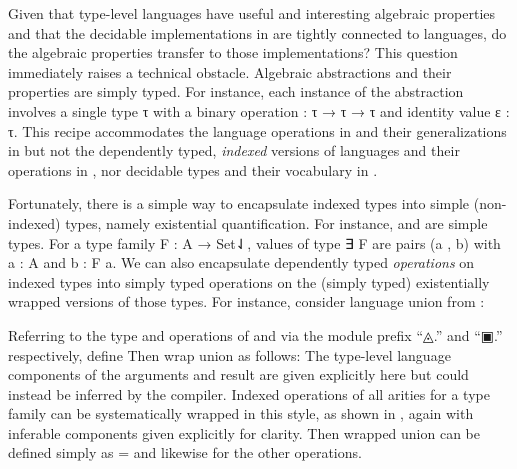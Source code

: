 \documentclass[acmsmall,screen]{acmart}
\begin{document}

\rnc{}

Given that type-level languages have useful and interesting algebraic properties and that the decidable implementations in  are tightly connected to languages, do the algebraic properties transfer to those implementations?
This question immediately raises a technical obstacle.
Algebraic abstractions and their properties are simply typed.
For instance, each instance of the  abstraction involves a single type \AB τ with a binary operation { \AK : \AB τ \AK → \AB τ \AK → \AB τ} and identity value {\AB ε \AK : \AB τ}.
This recipe accommodates the language operations in  and their generalizations in  but not the dependently typed, \emph{indexed} versions of languages and their operations in , nor decidable types and their vocabulary in .

Fortunately, there is a simple way to encapsulate indexed types into simple (non-indexed) types, namely existential quantification.
For instance, { } and { } are simple types.
For a type family {\AB F \AK : \AB A \AK → \APT Set⇃}, values of type {\AF ∃ \AB F} are pairs {(\AB a , \AB b)} with {\AB a \AK : \AB A} and {\AB b \AK : \AB F \AB a}.
We can also encapsulate dependently typed \emph{operations} on indexed types into simply typed operations on the (simply typed) existentially wrapped versions of those types.
For instance, consider language union from :
\begin{code}
\>[2]%
\>[7]\AgdaSymbol{:}\AgdaSpace{}%
%
\>[15]%
\>[18]\AgdaSpace{}%
\AgdaSpace{}%
%
\>[28]\AgdaSpace{}%
\AgdaSpace{}%
\AgdaSymbol{(}%
\>[39]%
\>[44]\AgdaSymbol{)}\<%
\end{code}
Referring to the type and operations of  and  via the module prefix ``{◬.}\hspace{0.05em}'' and ``{▣.}\hspace{0.05em}'' respectively, define 
Then wrap union as follows:
The type-level language components of the arguments and result are given explicitly here but could instead be inferred by the compiler.
\rnc{}
Indexed operations of all arities for a type family  can be systematically wrapped in this style, as shown in
, again with inferable components given explicitly for clarity.
Then wrapped union can be defined simply as { \AS =  } and likewise for the other operations.
\end{document}

